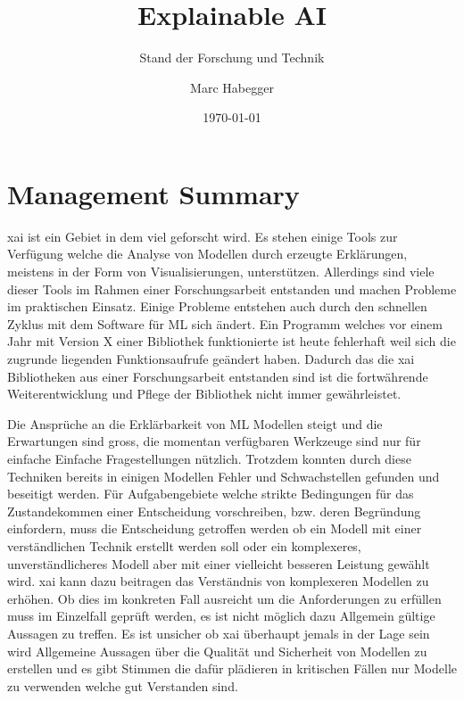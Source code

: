 \documentclass[
  12pt, %
  a4paper, %
  oneside, %
  openany, 
  numbers=noenddot, %
  BCOR=5mm, %
  parskip=half*, %
  thesis, %
]{bfhbook}
\author{Marc Habegger}
\title{Explainable AI}
\subtitle{Stand der Forschung und Technik}
\date{\today} %
\begin{document}
                         
\maketitle

\tableofcontents
\sloppy
\mainmatter %

\RaggedRight

\chapter{Management Summary}
\Gls{xai} ist ein Gebiet in dem viel geforscht wird. Es stehen einige Tools zur Verfügung welche die Analyse von Modellen durch erzeugte Erklärungen, meistens in der Form von Visualisierungen, unterstützen. Allerdings sind viele dieser Tools im Rahmen einer Forschungsarbeit entstanden und machen Probleme im praktischen Einsatz. Einige Probleme entstehen auch durch den schnellen Zyklus mit dem Software für \Gls{ML} sich ändert. Ein Programm welches vor einem Jahr mit Version X einer Bibliothek funktionierte ist heute fehlerhaft weil sich die zugrunde liegenden Funktionsaufrufe geändert haben. Dadurch das die \Gls{xai} Bibliotheken aus einer Forschungsarbeit entstanden sind ist die fortwährende Weiterentwicklung und Pflege der Bibliothek nicht immer gewährleistet. 

Die Ansprüche an die Erklärbarkeit von \Gls{ML} Modellen steigt und die Erwartungen sind gross, die momentan verfügbaren Werkzeuge sind nur für einfache Einfache Fragestellungen nützlich. Trotzdem konnten durch diese Techniken bereits in einigen Modellen Fehler und Schwachstellen gefunden und beseitigt werden. Für Aufgabengebiete welche strikte Bedingungen für das Zustandekommen einer Entscheidung vorschreiben, bzw. deren Begründung einfordern, muss die Entscheidung getroffen werden ob ein Modell mit einer verständlichen Technik erstellt werden soll oder ein komplexeres, unverständlicheres Modell aber mit einer vielleicht besseren Leistung gewählt wird. \Gls{xai} kann dazu beitragen das Verständnis von komplexeren Modellen zu erhöhen. Ob dies im konkreten Fall ausreicht um die Anforderungen zu erfüllen muss im Einzelfall geprüft werden, es ist nicht möglich dazu Allgemein gültige Aussagen zu treffen. Es ist unsicher ob \Gls{xai} überhaupt jemals in der Lage sein wird Allgemeine Aussagen über die Qualität und Sicherheit von Modellen zu erstellen und es gibt Stimmen die dafür plädieren in kritischen Fällen nur Modelle zu verwenden welche gut Verstanden sind.
\end{document}
